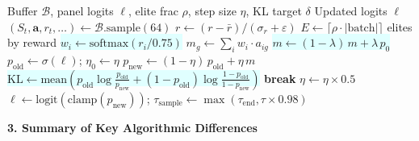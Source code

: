 \documentclass[8pt]{article}
\begin{document}
\begin{tcolorbox}[
    title={\textbf{Algorithm 2c:} Optimize Best --- KL-regularized CEM with trust-region backtracking},
    colback=lightcyan!30, colframe=addedB!70, fonttitle=\small\bfseries,
    boxrule=0.5pt, arc=2pt, left=4pt, right=4pt, top=2pt, bottom=2pt
]
\begin{algorithmic}[1]
\small
\Require Buffer $\mathcal{B}$, panel logits $\boldsymbol{\ell}$, elite frac $\rho$, step size $\eta$, KL target $\delta$
\Ensure Updated logits $\boldsymbol{\ell}$
    \State $(S_t, \mathbf{a}, r_t, \ldots) \gets \mathcal{B}.\text{sample}(64)$
    \State $r \gets (r - \bar{r}) / (\sigma_r + \varepsilon)$ 
    \State $E \gets \lceil \rho \cdot |\text{batch}| \rceil$ elites by reward
    \State \colorbox{lightcyan}{$w_i \gets \text{softmax}(r_i / 0.75)$} 
    \State $m_g \gets \sum_i w_i \cdot a_{ig}$ 
    \State \colorbox{lightcyan}{$m \gets (1 - \lambda)\,m + \lambda\, p_0$} 
    \State $p_\text{old} \gets \sigma(\boldsymbol{\ell})$; \quad $\eta_0 \gets \eta$
     
        \State $p_\text{new} \gets (1 - \eta)\,p_\text{old} + \eta\, m$
        \State \colorbox{lightcyan}{$\text{KL} \gets \text{mean}(p_\text{old} \log\frac{p_\text{old}}{p_\text{new}} + (1{-}p_\text{old})\log\frac{1{-}p_\text{old}}{1{-}p_\text{new}})$}
         \textbf{break}
        \Else\; $\eta \gets \eta \times 0.5$
        \EndIf
    \EndFor
    \State $\boldsymbol{\ell} \gets \text{logit}(\text{clamp}(p_\text{new}))$; \quad $\tau_\text{sample} \gets \max(\tau_\text{end}, \tau \times 0.98)$
\EndFor
\end{algorithmic}
\end{tcolorbox}

\newpage

{\large\bfseries 3. Summary of Key Algorithmic Differences}

\vspace{3pt}
\end{document}
